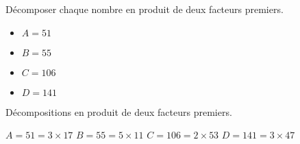 \begin{exercice*}
    \label{N2exosBase012}
    Décomposer chaque nombre en produit de deux facteurs premiers.
    \begin{itemize}
        \item[] $A=51$
        \item[] $B=55$
        \item[] $C=106$
        \item[] $D=141$
    \end{itemize}

\end{exercice*}
\begin{corrige}
    Décompositions en produit de deux facteurs premiers.
    
    \begin{itemize}
        \def\item{}
        \item $A=51 =3\times 17$
        \item $B=55 =5\times 11$
        \item $C=106=2\times 53$
        \item $D=141=3\times 47$
    \end{itemize}    
\end{corrige}


